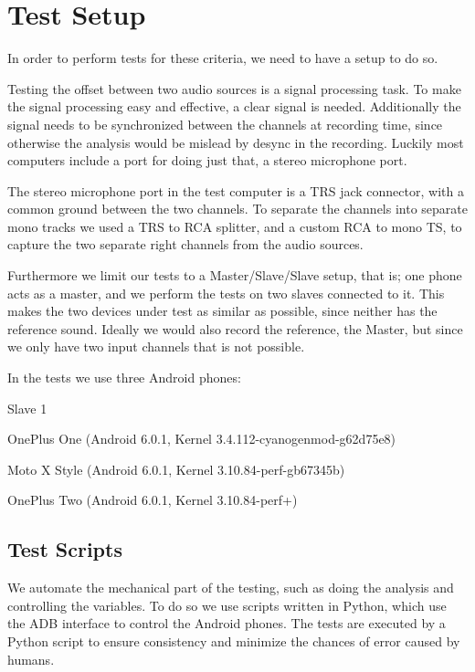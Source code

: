 \section{Test Setup}\label{sec:test_setup}
In order to perform tests for these criteria, we need to have a setup to do so.

Testing the offset between two audio sources is a signal processing
task. To make the signal processing easy and effective, a clear signal is
needed. Additionally the signal needs to be synchronized between the
channels at recording time, since otherwise the analysis would be
mislead by desync in the recording. Luckily most computers include
a port for doing just that, a stereo microphone port.

The stereo microphone port in the test computer is a \ac{TRS} jack
connector, with a common ground between the two channels. To separate
the channels into separate mono tracks we used a \ac{TRS} to \ac{RCA}
splitter, and a custom \ac{RCA} to mono \ac{TS}, to capture the two
separate right channels from the audio sources. 

Furthermore we limit our tests to a Master/Slave/Slave setup, that is;
one phone acts as a master, and we perform the tests on two slaves
connected to it. This makes the two devices under test as similar as
possible, since neither has the reference sound.
Ideally we would also record the reference, the Master,
but since we only have two input channels that is not possible.

In the tests we use three Android phones:
\begin{dankscription}{\bfseries}{Slave 1}
	\item[Master]OnePlus One (Android 6.0.1, Kernel 3.4.112-cyanogenmod-g62d75e8)
	\item[Slave 1]Moto X Style (Android 6.0.1, Kernel 3.10.84-perf-gb67345b)
	\item[Slave 2]OnePlus Two (Android 6.0.1, Kernel 3.10.84-perf+)
\end{dankscription}

\subsection{Test Scripts}
We automate the mechanical part of the testing, such as doing the
analysis and controlling the variables. To do so we use scripts written
in Python, which use the \ac{ADB} interface to control the Android
phones. The tests are executed by a Python script to ensure
consistency and minimize the chances of error caused by humans.

